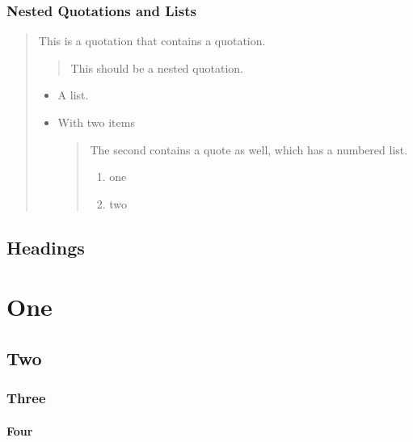 \subsection{\label{nested-quotations-and-lists}Nested Quotations and Lists}
\begin{quote}
\par This is a quotation that contains a quotation.
\begin{quote}
\par This should be a nested quotation.
\end{quote}

\begin{itemize}
\item 
\par A list. 
\item 
\par With two items
\begin{quote}
\par The second contains a quote as well, which has a numbered list.
\begin{enumerate}
\item 
\par one 
\item 
\par two
\end{enumerate}

\end{quote}

\end{itemize}

\end{quote}

\section{\label{headings}Headings}
\chapter{\label{one}One}
\section{\label{two}Two}
\subsection{\label{three}Three}
\subsubsection{\label{four}Four}

